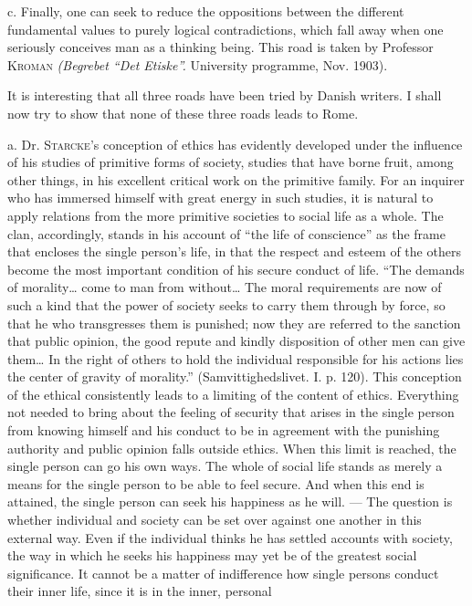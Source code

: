 \documentclass[12pt,a4paper,openany]{book}
\newcommand{\opage}[1]{\marginnote{\footnotesize\textit{[#1]}}}
\begin{document}
c. Finally, one can seek to reduce the oppositions between the different fundamental values to purely
logical contradictions, which fall away when one seriously conceives man as a thinking being. This
road is taken by Professor \textsc{Kroman} \textit{(Begrebet ``Det Etiske''.} University programme, Nov.
1903).

It is interesting that all three roads have been tried by Danish writers. I shall now try to show that
none of these three roads leads to Rome.

a. Dr. \textsc{Starcke}'s conception of ethics has evidently developed under the influence of his
studies of primitive forms of society, studies that have borne fruit, among other things, in his
excellent critical work on the primitive family. For an inquirer who has immersed himself with great
energy in such studies, it is natural to apply relations from the more primitive societies to social
life as a whole. The clan, accordingly, stands in his account of ``the life of conscience'' as the
frame that encloses the single person's life, in that the respect and esteem of the others become the
most important condition of his secure conduct of life. ``The demands of morality\dots{} come to man
from without\dots{} The moral requirements are now of such a kind that the power of society seeks to
carry them through by force, so that he who transgresses them is punished; now they are referred to the
sanction that public opinion, the good repute and kindly disposition of other men can give them\dots{}
In the right of others to hold the individual responsible for his actions lies the center of gravity
of morality.'' (Samvittighedslivet. I. p. 120). This conception of the ethical consistently leads to a
limiting of the content of ethics. Everything not needed to bring about the
\opage{70}feeling of security that arises in the single person from knowing himself and his conduct to be in
agreement with the punishing authority and public opinion falls outside ethics. When this limit is
reached, the single person can go his own ways. The whole of social life stands as merely a means for
the single person to be able to feel secure. And when this end is attained, the single person can seek
his happiness as he will. --- The question is whether individual and society can be set over against
one another in this external way. Even if the individual thinks he has settled accounts with society,
the way in which he seeks his happiness may yet be of the greatest social significance. It cannot be a
matter of indifference how single persons conduct their inner life, since it is in the inner, personal
\end{document}
